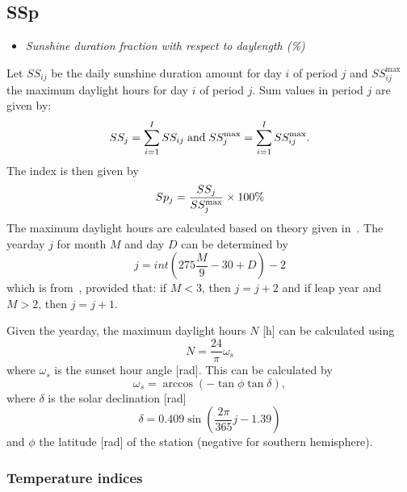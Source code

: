 \documentclass[a4paper,11pt]{article}
\begin{document}
\subsection*{SSp}
\begin{itemize}
\item \textit{Sunshine duration fraction with respect to daylength (\%)}
\end{itemize}
Let $SS_{ij}$ be the daily sunshine duration amount for day $i$ of period $j$ and $SS_{ij}^{\text{max}}$ the maximum daylight
hours for day $i$ of period $j$. Sum values in period $j$ are given by:
\begin{equation}
SS_j = \sum_{i=1}^I SS_{ij} \; \text{and} \;
SS_j^{\text{max}} = \sum_{i=1}^I SS_{ij}^{\text{max}}. \notag
\end{equation}
The index is then given by
\begin{equation}
Sp_j = \frac{SS_j}{SS_j^{\text{max}}} \times 100\% \notag
\end{equation}
The maximum daylight hours are calculated based on theory given in~\cite{allen:94b}.
The yearday $j$ for month $M$ and day $D$ can be determined by
\begin{equation} \label{eq:c1}
j = int \left( 275 \frac{M}{9} - 30 + D \right) - 2
\end{equation}
which is from~\cite[eq. 1.26]{allen:94b}, provided that: if $M < 3$, then $j = j + 2$ and if leap year and $M > 2$, then
$j = j + 1$.

Given the yearday, the maximum daylight hours $N$ [h] can be calculated using~\cite[eq. 1.34]{allen:94b}
\begin{equation} \label{eq:c2}
N = \frac{24}{\pi} \omega_s
\end{equation}
where $\omega_s$ is the sunset hour angle [rad]. This can be calculated by~\cite[eq. 1.23]{allen:94b}
\begin{equation} \label{eq:c3}
\omega_s = \arccos \left( -\tan \phi \tan \delta \right),
\end{equation}
where $\delta$ is the solar declination [rad]~\cite[eq. 1.25]{allen:94b}
\begin{equation} \label{eq:c4}
\delta = 0.409 \sin \left( \frac{2 \pi}{365} j - 1.39 \right)
\end{equation}
and $\phi$ the latitude [rad] of the station (negative for southern hemisphere).

\subsubsection{Temperature indices}
\end{document}
